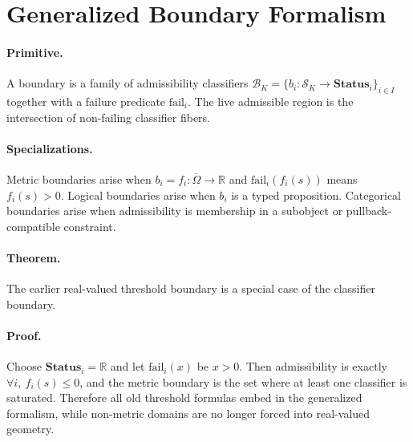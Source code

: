 
\section{Generalized Boundary Formalism}
\label{app:oc133-boundary}

\paragraph{Primitive.}
A boundary is a family of admissibility classifiers
\(\mathcal{B}_K=\{b_i:\mathcal{S}_K\to\mathbf{Status}_i\}_{i\in I}\)
together with a failure predicate \(\mathrm{fail}_i\).  The live admissible
region is the intersection of non-failing classifier fibers.

\paragraph{Specializations.}
Metric boundaries arise when \(b_i=f_i:\overline{\Omega}\to\mathbb{R}\) and
\(\mathrm{fail}_i(f_i(s))\) means \(f_i(s)>0\).  Logical boundaries arise when
\(b_i\) is a typed proposition.  Categorical boundaries arise when
admissibility is membership in a subobject or pullback-compatible constraint.

\paragraph{Theorem.}
The earlier real-valued threshold boundary is a special case of the
classifier boundary.

\paragraph{Proof.}
Choose \(\mathbf{Status}_i=\mathbb{R}\) and let
\(\mathrm{fail}_i(x)\) be \(x>0\).  Then admissibility is exactly
\(\forall i,\ f_i(s)\le0\), and the metric boundary is the set where at least
one classifier is saturated.  Therefore all old threshold formulas embed in
the generalized formalism, while non-metric domains are no longer forced into
real-valued geometry.

